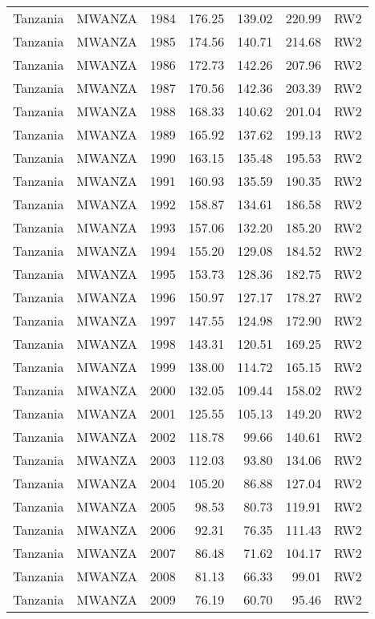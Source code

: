 \begin{longtable}{lllrrrl}
  Tanzania & MWANZA & 1984 & 176.25 & 139.02 & 220.99 & RW2 \\ 
  Tanzania & MWANZA & 1985 & 174.56 & 140.71 & 214.68 & RW2 \\ 
  Tanzania & MWANZA & 1986 & 172.73 & 142.26 & 207.96 & RW2 \\ 
  Tanzania & MWANZA & 1987 & 170.56 & 142.36 & 203.39 & RW2 \\ 
  Tanzania & MWANZA & 1988 & 168.33 & 140.62 & 201.04 & RW2 \\ 
  Tanzania & MWANZA & 1989 & 165.92 & 137.62 & 199.13 & RW2 \\ 
  Tanzania & MWANZA & 1990 & 163.15 & 135.48 & 195.53 & RW2 \\ 
  Tanzania & MWANZA & 1991 & 160.93 & 135.59 & 190.35 & RW2 \\ 
  Tanzania & MWANZA & 1992 & 158.87 & 134.61 & 186.58 & RW2 \\ 
  Tanzania & MWANZA & 1993 & 157.06 & 132.20 & 185.20 & RW2 \\ 
  Tanzania & MWANZA & 1994 & 155.20 & 129.08 & 184.52 & RW2 \\ 
  Tanzania & MWANZA & 1995 & 153.73 & 128.36 & 182.75 & RW2 \\ 
  Tanzania & MWANZA & 1996 & 150.97 & 127.17 & 178.27 & RW2 \\ 
  Tanzania & MWANZA & 1997 & 147.55 & 124.98 & 172.90 & RW2 \\ 
  Tanzania & MWANZA & 1998 & 143.31 & 120.51 & 169.25 & RW2 \\ 
  Tanzania & MWANZA & 1999 & 138.00 & 114.72 & 165.15 & RW2 \\ 
  Tanzania & MWANZA & 2000 & 132.05 & 109.44 & 158.02 & RW2 \\ 
  Tanzania & MWANZA & 2001 & 125.55 & 105.13 & 149.20 & RW2 \\ 
  Tanzania & MWANZA & 2002 & 118.78 & 99.66 & 140.61 & RW2 \\ 
  Tanzania & MWANZA & 2003 & 112.03 & 93.80 & 134.06 & RW2 \\ 
  Tanzania & MWANZA & 2004 & 105.20 & 86.88 & 127.04 & RW2 \\ 
  Tanzania & MWANZA & 2005 & 98.53 & 80.73 & 119.91 & RW2 \\ 
  Tanzania & MWANZA & 2006 & 92.31 & 76.35 & 111.43 & RW2 \\ 
  Tanzania & MWANZA & 2007 & 86.48 & 71.62 & 104.17 & RW2 \\ 
  Tanzania & MWANZA & 2008 & 81.13 & 66.33 & 99.01 & RW2 \\ 
  Tanzania & MWANZA & 2009 & 76.19 & 60.70 & 95.46 & RW2 \\ 

\end{longtable}
